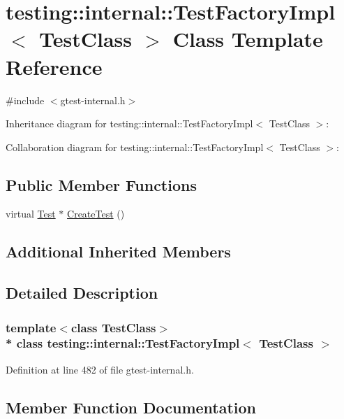 \hypertarget{classtesting_1_1internal_1_1_test_factory_impl}{}\section{testing\+:\+:internal\+:\+:Test\+Factory\+Impl$<$ Test\+Class $>$ Class Template Reference}
\label{classtesting_1_1internal_1_1_test_factory_impl}


{\ttfamily \#include $<$gtest-\/internal.\+h$>$}



Inheritance diagram for testing\+:\+:internal\+:\+:Test\+Factory\+Impl$<$ Test\+Class $>$\+:


Collaboration diagram for testing\+:\+:internal\+:\+:Test\+Factory\+Impl$<$ Test\+Class $>$\+:
\subsection*{Public Member Functions}
\begin{DoxyCompactItemize}
\item 
virtual \hyperlink{classtesting_1_1_test}{Test} $\ast$ \hyperlink{classtesting_1_1internal_1_1_test_factory_impl_a8860c89bdb06450a5d5e8137ebd9d775}{Create\+Test} ()
\end{DoxyCompactItemize}
\subsection*{Additional Inherited Members}


\subsection{Detailed Description}
\subsubsection*{template$<$class Test\+Class$>$\\*
class testing\+::internal\+::\+Test\+Factory\+Impl$<$ Test\+Class $>$}



Definition at line 482 of file gtest-\/internal.\+h.



\subsection{Member Function Documentation}
